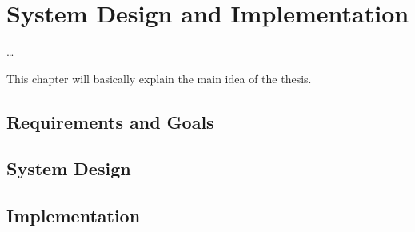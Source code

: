 \chapter{System Design and Implementation} \label{chap:design_and_impl}

\ifpdf
    \graphicspath{{7/figures/PNG/}{7/figures/PDF/}{7/figures/}}
\else
    \graphicspath{{7/figures/EPS/}{7/figures/}}
\fi

\dots

This chapter will basically explain the main idea of the thesis. 

\section{Requirements and Goals} \label{chap_desgin:sec:req_and_goal}
\section{System Design} \label{chap_desgin:sec:design}
\section{Implementation} \label{chap_desgin:sec:impl}